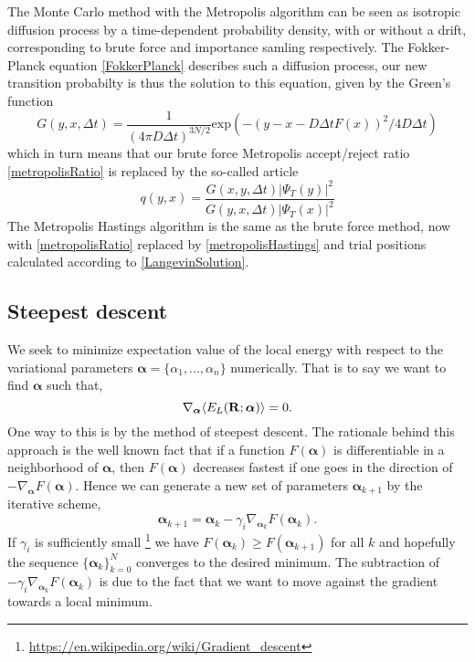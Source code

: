 \documentclass[english, a4paper]{article}
\begin{document}
\noindent The Monte Carlo method with the Metropolis algorithm can be seen as isotropic diffusion process 
by a time-dependent 
probability density, with or without a drift, corresponding to brute force and importance samling respectively.
The Fokker-Planck equation \eqref{FokkerPlanck} describes such a diffusion process, our
new transition probabilty is thus the solution to this equation, given by the Green's function
\begin{equation}
 G(y, x, \Delta t) = \frac{1}{(4\pi D \Delta t)^{3N/2}}
 \textrm{exp}(-(y - x - D\Delta t F(x))^2 / 4D\Delta t)
\end{equation}
which in turn means that our brute force Metropolis accept/reject ratio \eqref{metropolisRatio} is replaced by
the so-called  article
\begin{equation}
 q(y, x) = \frac{G(x, y, \Delta t)|\Psi_T(y)|^2}{G(y, x, \Delta t)|\Psi_T(x)|^2}
 \label{metropolisHastings}
\end{equation}
The Metropolis Hastings algorithm is the same as the brute force method, now with \eqref{metropolisRatio} 
replaced by 
\eqref{metropolisHastings} and trial positions
calculated according to \eqref{LangevinSolution}.


\subsection{Steepest descent} \label{Steepest Descent chapter}
We seek to minimize expectation value of the local energy with respect to the variational parameters 
${\bm \alpha} = \{\alpha_1,...,\alpha_n \}$ numerically.
That is to say we want to find ${\bm \alpha}$ such that,
\begin{equation}
 \nabla_{{\bm \alpha}} \langle E_L({\bf R}; {\bm \alpha}) \rangle = 0.
\end{equation}
One way to this is by the method of steepest descent. The rationale behind this approach is the well known fact that if
a function $F({\bm \alpha})$ is differentiable in a neighborhood of ${\bm \alpha}$, then $F({\bm \alpha})$ 
decreases fastest if one goes in
the direction of $-\nabla_{{\bm \alpha}}F({\bm \alpha})$. Hence we can generate a new set of parameters 
${\bm \alpha}_{k+1}$ by the iterative scheme,
\begin{equation}
 {\bm \alpha}_{k+1} = {\bm \alpha}_{k} - \gamma_i \nabla_{{\bm \alpha}_{k}}F({\bm \alpha}_k).
\end{equation}
If $\gamma_i$ is sufficiently small 
\footnote{\href{https://en.wikipedia.org/wiki/Gradient_descent}{https://en.wikipedia.org/wiki/Gradient\_descent}} 
we have $F({\bm \alpha}_k) \geq F({\bm \alpha}_{k+1})$  for 
all $k$ and hopefully the sequence $\{{\bm \alpha}_k \}_{k=0}^N$
converges to the desired minimum. The subtraction of $- \gamma_i \nabla_{{\bm \alpha}_{k}}F({\bm \alpha}_k)$ is due
to the fact that we want to move against the gradient towards a local minimum.\\
\end{document}
